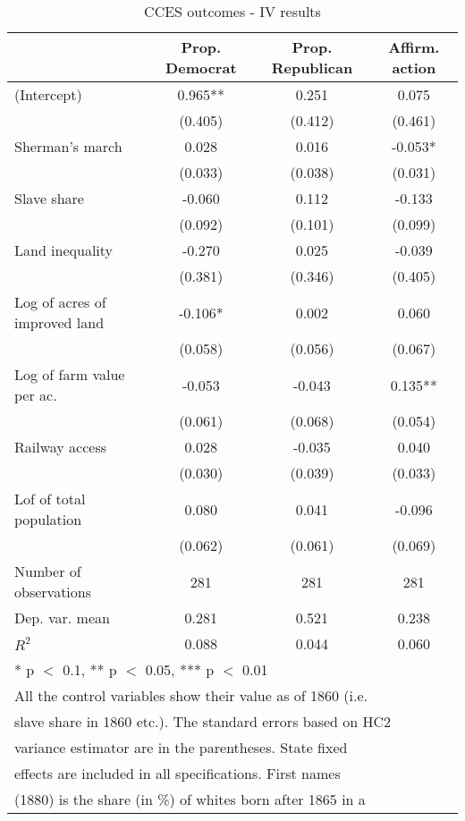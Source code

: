 \begin{table}

\caption{\label{tab:}CCES outcomes - IV results}
\centering
\begin{tabular}[t]{lccc}
\toprule
  & Prop. Democrat & Prop. Republican & Affirm. action\\
\midrule
(Intercept) & 0.965** & 0.251 & 0.075\\
 & (0.405) & (0.412) & (0.461)\\
Sherman's march & 0.028 & 0.016 & -0.053*\\
 & (0.033) & (0.038) & (0.031)\\
Slave share & -0.060 & 0.112 & -0.133\\
 & (0.092) & (0.101) & (0.099)\\
Land inequality & -0.270 & 0.025 & -0.039\\
 & (0.381) & (0.346) & (0.405)\\
Log of acres of improved land & -0.106* & 0.002 & 0.060\\
 & (0.058) & (0.056) & (0.067)\\
Log of farm value per ac. & -0.053 & -0.043 & 0.135**\\
 & (0.061) & (0.068) & (0.054)\\
Railway access & 0.028 & -0.035 & 0.040\\
 & (0.030) & (0.039) & (0.033)\\
Lof of total population & 0.080 & 0.041 & -0.096\\
 & (0.062) & (0.061) & (0.069)\\
\midrule
Number of observations & 281 & 281 & 281\\
Dep. var. mean & 0.281 & 0.521 & 0.238\\
$R^2$ & 0.088 & 0.044 & 0.060\\
\bottomrule
\multicolumn{4}{l}{\textsuperscript{} * p $<$ 0.1, ** p $<$ 0.05, *** p $<$ 0.01}\\
\multicolumn{4}{l}{\textsuperscript{} All the control variables show their value as of 1860 (i.e.}\\
\multicolumn{4}{l}{slave share in 1860 etc.). The standard errors based on HC2}\\
\multicolumn{4}{l}{variance estimator are in the parentheses. State fixed}\\
\multicolumn{4}{l}{effects are included in all specifications. First names}\\
\multicolumn{4}{l}{(1880) is the share (in \%) of whites born after 1865 in a}\\

\end{tabular}
\end{table}
